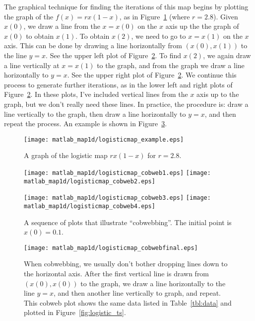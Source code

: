 The graphical technique for finding the iterations of this map
begins by plotting the graph of the $f(x) = rx(1-x)$, as in
Figure~\ref{fig:logisticmap_example} (where $r=2.8$).
Given $x(0)$, we draw a line from the $x=x(0)$ on the $x$
axis up the the graph of $x(0)$ to obtain $x(1)$.
To obtain $x(2)$, we need to go to $x=x(1)$ on the $x$ axis.
This can be done by drawing a line horizontally from
$(x(0),x(1))$ to the line $y=x$.
See the upper left plot of Figure~\ref{fig:cobwebsequence}.
To find $x(2)$, we again draw a line vertically
at $x=x(1)$ to the graph, and from the graph we draw a 
line horizontally to $y=x$.
See the upper right plot of Figure~\ref{fig:cobwebsequence}.
We continue this process to generate further iterations,
as in the lower left and right plots of
Figure~\ref{fig:cobwebsequence}.
In these plots, I've included vertical lines from the $x$ axis
up to the graph, but we don't really need these lines.
In practice, the procedure is: 
draw a line vertically
to the graph, then 
draw a line horizontally to $y=x$,  and then repeat
the process.
An example is shown in Figure~\ref{fig:cobwebfinal}.

\begin{figure}
\centerline{\texttt{[image: matlab\_map1d/logisticmap\_example.eps]}}
\caption{A graph of the logistic map $rx(1-x)$ for $r=2.8$.}
\label{fig:logisticmap_example}
\end{figure}
%
\begin{figure}
\centerline{%
\texttt{[image: matlab\_map1d/logisticmap\_cobweb1.eps]}
\texttt{[image: matlab\_map1d/logisticmap\_cobweb2.eps]}
}
\centerline{%
\texttt{[image: matlab\_map1d/logisticmap\_cobweb3.eps]}
\texttt{[image: matlab\_map1d/logisticmap\_cobweb4.eps]}
}
\caption{A sequence of plots that illustrate
``cobwebbing''. The initial point is $x(0)=0.1$.}
\label{fig:cobwebsequence}
\end{figure}
%
\begin{figure}
\centerline{%
\texttt{[image: matlab\_map1d/logisticmap\_cobwebfinal.eps]}
}
\caption{When cobwebbing, we usually don't bother dropping
lines down to the horizontal axis. After the first vertical
line is drawn from $(x(0),x(0))$ to the graph, we draw
a line horizontally to the line
$y=x$, and then another line vertically to graph, and repeat.
This cobweb plot shows
the same data listed in Table~\ref{tbl:data} and plotted in
Figure~\ref{fig:logistic_ts}.}
\label{fig:cobwebfinal} 
\end{figure}
%


